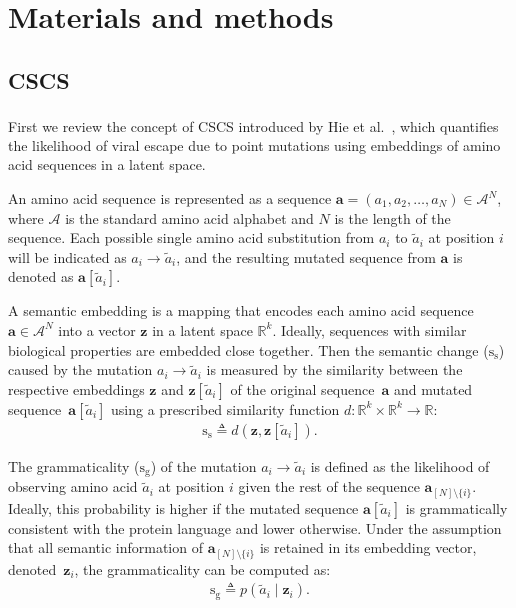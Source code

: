 \documentclass[pdflatex,sn-nature]{sn-jnl}
\renewcommand\cite[1]{\unskip\textsuperscript{\citep{#1}}}
\begin{document}
\section*{Materials and methods}\label{sec:methods}

\subsection*{CSCS}%

First we review the concept of CSCS introduced by Hie et al.~\cite{hie2021learning}, which quantifies the likelihood of viral escape due to point mutations using embeddings of amino acid sequences in a latent space.

An amino acid sequence is represented as a sequence $\mathbf{a} = (a_1, a_2, \dots, a_N) \in \mathcal{A}^N$, where $\mathcal{A}$ is the standard amino acid alphabet and $N$ is the length of the sequence. Each possible single amino acid substitution from $a_i$ to $\tilde{a}_i$ at position $i$ will be indicated as $a_i \to \tilde{a}_i$, and the resulting mutated sequence from $\mathbf{a}$ is denoted as $\mathbf{a}[\tilde{a}_i]$.

A semantic embedding is a mapping that encodes each amino acid sequence $\mathbf{a} \in \mathcal{A}^N$ into a vector $\mathbf{z}$ in a latent space $\mathbb{R}^k$.
Ideally, sequences with similar biological properties are embedded close together.
Then the semantic change ($\mathrm{s}_\text{s}$) caused by the mutation $a_i \to \tilde{a}_i$ is measured by the similarity between the respective embeddings $\mathbf{z}$ and $\mathbf{z}[\tilde{a}_i]$ of the original sequence~$\mathbf{a}$ and mutated sequence~$\mathbf{a}[\tilde{a}_i]$ using a prescribed similarity function $d : \mathbb{R}^k \times \mathbb{R}^k \to \mathbb{R} $:
\begin{align}
    \mathrm{s}_\text{s}
    \triangleq d(\mathbf{z}, \mathbf{z}[\tilde{a}_i]).
    \label{e:sc_theory}
\end{align}

The grammaticality ($\mathrm{s}_\text{g}$) of the mutation $a_i \to \tilde{a}_i$ is defined as the likelihood of observing amino acid $\tilde{a}_i$ at position $i$ given the rest of the sequence $\mathbf{a}_{[N]\setminus\{i\}}$.
Ideally, this probability is higher if the mutated sequence $\mathbf{a}[\tilde{a}_i]$ is grammatically consistent with the protein language and lower otherwise.
%
Under the assumption that all semantic information of $\mathbf{a}_{[N]\setminus\{i\}}$ is retained in its embedding vector, denoted~$\mathbf{z}_i$, the grammaticality can be computed as:
\begin{align}
    \mathrm{s}_\text{g}
    \triangleq
    p(\tilde{a}_i \mid \mathbf{z}_i).
    \label{e:g_theory}
\end{align}
\end{document}
